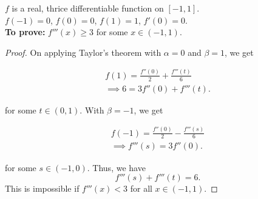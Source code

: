 \documentclass[12pt]{article}
\begin{document}
$f$ is a real, thrice differentiable function on $[-1, 1]$.\\
$f(-1)=0$, $f(0)=0$, $f(1)=1$, $f'(0)=0$.\\

{\bf To prove:} $f'''(x)\geq 3$ for some $x\in(-1, 1)$.

\begin{proof}
On applying Taylor's theorem with $\alpha=0$ and $\beta=1$, we get

\begin{align*}
f(1)=\frac{f''(0)}{2}+\frac{f'''(t)}{6} \\
\implies 6=3f''(0)+f'''(t).
\end{align*}

for some $t\in(0, 1)$. With $\beta=-1$, we get

\begin{align*}
f(-1)=\frac{f''(0)}{2}-\frac{f'''(s)}{6} \\
\implies f'''(s)=3f''(0).
\end{align*}

for some $s\in(-1, 0)$. Thus, we have
$$
f'''(s)+f'''(t)=6.
$$
This is impossible if $f'''(x)<3$ for all $x\in(-1, 1)$. 
\end{proof}
\end{document}
